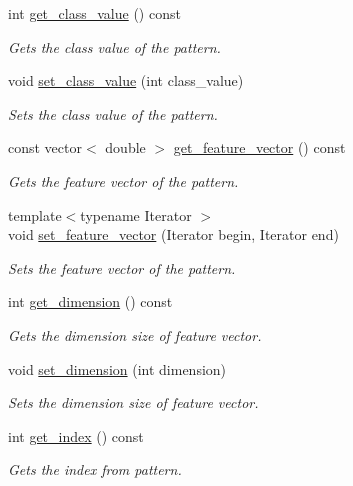 \begin{DoxyCompactItemize}
int \hyperlink{classPattern_aae331219e63c782b23f203ebad3aa7bc}{get\+\_\+class\+\_\+value} () const 
\begin{DoxyCompactList}\small\item\em Gets the class value of the pattern. \end{DoxyCompactList}\item 
void \hyperlink{classPattern_ac4235d677a656d5cc272d192af210d4f}{set\+\_\+class\+\_\+value} (int class\+\_\+value)
\begin{DoxyCompactList}\small\item\em Sets the class value of the pattern. \end{DoxyCompactList}\item 
const vector$<$ double $>$ \hyperlink{classPattern_aae9583bcb7da91e9ae347a392ae77a52}{get\+\_\+feature\+\_\+vector} () const 
\begin{DoxyCompactList}\small\item\em Gets the feature vector of the pattern. \end{DoxyCompactList}\item 
{\footnotesize template$<$typename Iterator $>$ }\\void \hyperlink{classPattern_a325cfe99a75f6e2befccef37ea347135}{set\+\_\+feature\+\_\+vector} (Iterator begin, Iterator end)
\begin{DoxyCompactList}\small\item\em Sets the feature vector of the pattern. \end{DoxyCompactList}\item 
int \hyperlink{classPattern_a3301651f9617962a7dd15575d381d8de}{get\+\_\+dimension} () const 
\begin{DoxyCompactList}\small\item\em Gets the dimension size of feature vector. \end{DoxyCompactList}\item 
void \hyperlink{classPattern_aa498151def7e9e9fabf874bfead90b3b}{set\+\_\+dimension} (int dimension)
\begin{DoxyCompactList}\small\item\em Sets the dimension size of feature vector. \end{DoxyCompactList}\item 
int \hyperlink{classPattern_a96c0f3b51801a27d0f8b06031b508b42}{get\+\_\+index} () const 
\begin{DoxyCompactList}\small\item\em Gets the index from pattern. \end{DoxyCompactList}\item 

\end{DoxyCompactItemize}
